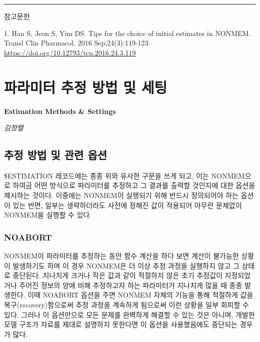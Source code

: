\documentclass[
  10pt,
]{krantz}
\newenvironment{Shaded}{\begin{snugshade}}{\end{snugshade}}
\newcommand{\DecValTok}[1]{\textcolor[rgb]{0.00,0.00,0.81}{#1}}
\newcommand{\FunctionTok}[1]{\textcolor[rgb]{0.00,0.00,0.00}{#1}}
\newcommand{\KeywordTok}[1]{\textcolor[rgb]{0.13,0.29,0.53}{\textbf{#1}}}
\newcommand{\NormalTok}[1]{#1}
\begin{document}
\begin{center}\rule{0.5\linewidth}{0.5pt}\end{center}

참고문헌

1. Han S, Jeon S, Yim DS. Tips for the choice of initial estimates in NONMEM. Transl Clin Pharmacol. 2016 Sep;24(3):119-123. \url{https://doi.org/10.12793/tcp.2016.24.3.119}

\hypertarget{estimation-methods}{%
\chapter{파라미터 추정 방법 및 세팅}\label{estimation-methods}}

\textbf{Estimation Methods \& Settings}

\emph{김정렬}

\hypertarget{uxcd94uxc815-uxbc29uxbc95-uxbc0f-uxad00uxb828-uxc635uxc158}{%
\section{추정 방법 및 관련 옵션}\label{uxcd94uxc815-uxbc29uxbc95-uxbc0f-uxad00uxb828-uxc635uxc158}}

\begin{Shaded}
\end{Shaded}

\$ESTIMATION 레코드에는 종종 위와 유사한 구문을 쓰게 되고, 이는 NONMEM으로 하여금 어떤 방식으로 파라미터를 추정하고 그 결과를 출력할 것인지에 대한 옵션을 제시하는 것이다. 이중에는 NONMEM이 실행되기 위해 반드시 정의되어야 하는 옵션이 있는 반면, 일부는 생략하더라도 사전에 정해진 값이 적용되어 아무런 문제없이 NONMEM을 실행할 수 있다.

\hypertarget{noabort}{%
\subsection{NOABORT}\label{noabort}}

NONMEM이 파라미터를 추정하는 동안 함수 계산을 하다 보면 계산이 불가능한 상황이 발생하기도 하며 이 경우 NONMEM은 더 이상 추정 과정을 실행하지 않고 그 상태로 중단된다. 지나치게 크거나 작은 값과 같이 적절하지 않은 초기 추정값이 지정되었거나 주어진 정보의 양에 비해 추정하고자 하는 파라미터가 지나치게 많을 때 종종 발생한다. 이때 NOABORT 옵션을 주면 NONMEM 자체의 기능을 통해 적절하게 값을 복구(recovery)함으로써 추정 과정을 계속하게 됨으로써 이런 상황을 일부 회피할 수 있다. 그러나 이 옵션만으로 모든 문제를 완벽하게 해결할 수 있는 것은 아니며, 개발한 모델 구조가 자료를 제대로 설명하지 못한다면 이 옵션을 사용했음에도 중단되는 경우가 많다.
\end{document}
